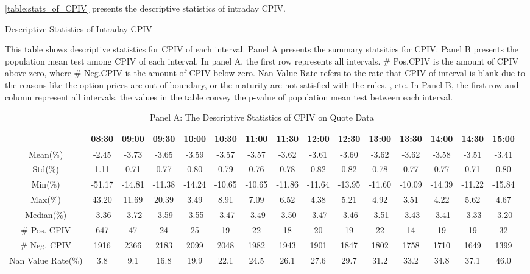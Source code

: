 \autoref{table:stats_of_CPIV} presents the descriptive statistics of intraday CPIV.



\begin{table}[h]
\centering
\caption{Descriptive Statistics of Intraday CPIV}\label{table:stats_of_CPIV}
\begin{threeparttable}

\medskip


{\scriptsize 
This table shows descriptive statistics for CPIV of each interval. Panel A presents the summary statsitics for CPIV. Panel B presents the population mean test among CPIV of each interval. In panel A, the first row represents all intervals.  \# Pos.CPIV is the amount of CPIV above zero, where \# Neg.CPIV is the amount of CPIV below zero. Nan Value Rate refers to the rate that CPIV of interval is blank due to the reasons like the option prices are out of boundary, or the maturity are not satisfied with the rules, , etc. In Panel B, the first row and column represent all intervals. the values in the table convey the p-value of population mean test between each interval. 
}
\medskip
\begin{subtable}[t]{\linewidth}

\caption{Panel A: The Descriptive Statistics of CPIV on Quote Data }
\tiny
\begin{tabular}{ccccccccccccccc}
\toprule
\textbf{}        & 08:30 & 09:00 & 09:30 & 10:00 & 10:30 & 11:00 & 11:30 & 12:00 & 12:30 & 13:00 & 13:30 & 14:00 & 14:30 & 15:00 \\ \midrule
Mean(\%)         & -2.45 & -3.73 & -3.65 & -3.59 & -3.57 & -3.57 & -3.62 & -3.61 & -3.60 & -3.62 & -3.62 & -3.58 & -3.51 & -3.41 \\
Std(\%)          & 1.11  & 0.71  & 0.77  & 0.80  & 0.79  & 0.76  & 0.78  & 0.82  & 0.82  & 0.78  & 0.77  & 0.77  & 0.71  & 0.80  \\
Min(\%)          & -51.17 & -14.81 & -11.38 & -14.24 & -10.65 & -10.65 & -11.86 & -11.64 & -13.95 & -11.60 & -10.09 & -14.39 & -11.22 & -15.84 \\
Max(\%)          & 43.20  & 11.69  & 20.39  & 3.49   & 8.91   & 7.09   & 6.52   & 4.38   & 5.21   & 4.92   & 3.51   & 4.22   & 5.62   & 4.67   \\
Median(\%)       & -3.36  & -3.72  & -3.59  & -3.55  & -3.47  & -3.49  & -3.50  & -3.47  & -3.46  & -3.51  & -3.43  & -3.41  & -3.33  & -3.20  \\
\# Pos. CPIV     & 647   & 47    & 24    & 25    & 19    & 22    & 18    & 20    & 19    & 22    & 14    & 19    & 19    & 32    \\
\# Neg. CPIV     & 1916  & 2366  & 2183  & 2099  & 2048  & 1982  & 1943  & 1901  & 1847  & 1802  & 1758  & 1710  & 1649  & 1399  \\
Nan Value Rate(\%) & 3.8   & 9.1   & 16.8  & 19.9  & 22.1  & 24.5  & 26.1  & 27.6  & 29.7  & 31.2  & 33.2  & 34.8  & 37.1  & 46.0  \\ \bottomrule
\end{tabular}
\end{subtable}


\end{threeparttable}
\end{table}
